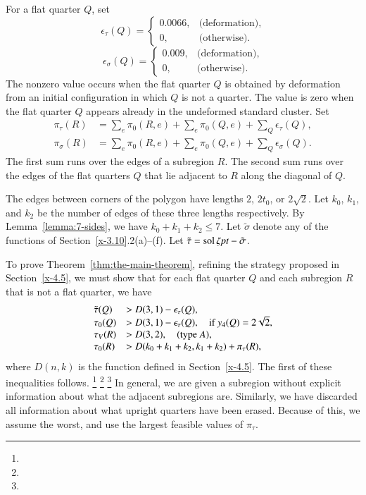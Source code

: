 For a flat quarter $Q$, set
    $$
    \epsilon_\tau(Q) =
        \begin{cases} 0.0066,&\text{(deformation),}\\
            0,&\text{(otherwise)}.
        \end{cases}
    $$
    $$
    \epsilon_\sigma(Q) =
        \begin{cases}
         0.009,&\text{(deformation),}\\
            0,&\text{(otherwise)}.
        \end{cases}
    $$
The nonzero value occurs when the flat quarter $Q$ is obtained by
deformation from an initial configuration in which $Q$ is not a quarter.
The value is zero when the flat quarter $Q$ appears already in the
undeformed standard cluster. Set
    $$
    \begin{array}{lll}
    \pi_\tau(R) &= \sum_e \pi_0(R,e) +
    \sum_e\pi_0(Q,e)+\sum_Q \epsilon_\tau(Q),\\
    \pi_\sigma(R)&=\sum_e \pi_0(R,e) +
    \sum_e\pi_0(Q,e)+\sum_Q \epsilon_\sigma(Q).
    \end{array}
    $$
The first sum runs over the edges of a subregion $R$.  The second sum
runs over the edges of the flat quarters $Q$ that lie adjacent to $R$
along the diagonal of $Q$.

The edges between corners of the polygon have lengths $2$, $2t_0$, or
$2\sqrt{2}$.  Let $k_0$, $k_1$, and $k_2$ be the number of edges of
these three lengths respectively.  By Lemma~\ref{lemma:7-sides}, we have
$k_0+k_1+k_2\le7$. Let $\tilde\sigma$ denote any of the functions of
Section~\ref{x-3.10}.2(a)--(f). Let $\tilde\tau = \operatorname{sol}\zeta\hbox{\it pt} -
\tilde\sigma$.

To prove Theorem~\ref{thm:the-main-theorem}, refining the strategy
proposed in Section~\ref{x-4.5}, we must show that for each flat quarter
$Q$ and each subregion $R$ that is not a flat quarter, we have
    \begin{equation}
    \begin{array}{lll}
    \tilde\tau(Q) &> D(3,1) - \epsilon_\tau(Q),\\
    \tau_0(Q) &> D(3,1)-\epsilon_\tau(Q),\quad\text{if }y_4(Q)=2\sqrt2,\\
    \tau_V(R) &> D(3,2),\quad\text{(type $A$)},\\
    \tau_0(R) &> D(k_0+k_1+k_2,k_1+k_2)+\pi_\tau(R),
    \label{eqn:tau>D(n,k)}
    \end{array}
    \end{equation}
where $D(n,k)$ is the function defined in Section~\ref{x-4.5}. The first
of these inequalities follows.%
\footnote{} %
\footnote{} %
\footnote{} %
In general,
we are given a subregion without explicit information about what the
adjacent subregions are.  Similarly, we have discarded all information
about what upright quarters have been erased.  Because of this, we
assume the worst, and use the largest feasible values of $\pi_\tau$.

